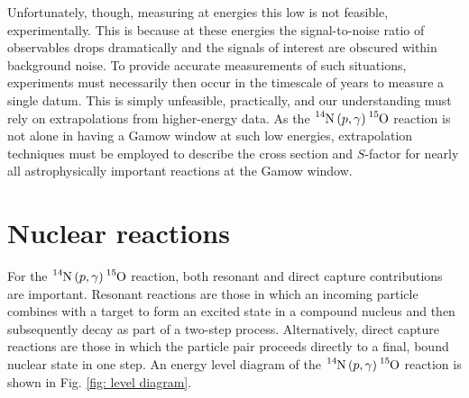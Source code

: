Unfortunately, though, measuring at energies this low is not feasible, experimentally. This is because at these energies the signal-to-noise ratio of observables drops dramatically and the signals of interest are obscured within background noise. To provide accurate measurements of such situations, experiments must necessarily then occur in the timescale of years to measure a single datum. This is simply unfeasible, practically, and our understanding must rely on extrapolations from higher-energy data. As the $\ce{^{14}N} \left( p, \gamma \right) \ce{^{15}O}$ reaction is not alone in having a Gamow window at such low energies, extrapolation techniques must be employed to describe the cross section and $S$-factor for nearly all astrophysically important reactions at the Gamow window. 



\section{Nuclear reactions}
\label{sec: reactions}

For the $\ce{^{14}N} \left( p, \gamma \right) \ce{^{15}O}$ reaction, both resonant and direct capture contributions are important. Resonant reactions are those in which an incoming particle combines with a target to form an excited state in a compound nucleus and then subsequently decay as part of a two-step process. Alternatively, direct capture reactions are those in which the particle pair proceeds directly to a final, bound nuclear state in one step. An energy level diagram of the $\ce{^{14}N} \left( p, \gamma \right) \ce{^{15}O}$ reaction is shown in Fig. \ref{fig: level diagram}.

